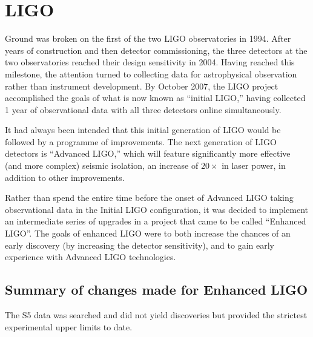 \section{LIGO}

Ground was broken on the first of the two LIGO observatories in 1994.
After years of construction and then detector commissioning, the three
detectors at the two observatories reached their design sensitivity in
2004.  Having reached this milestone, the attention turned to
collecting data for astrophysical observation rather than instrument
development.  By October 2007, the LIGO project accomplished the goals
of what is now known as ``initial LIGO,'' having collected 1 year of
observational data with all three detectors online simultaneously.

It had always been intended that this initial generation of LIGO would
be followed by a programme of improvements.  The next generation of
LIGO detectors is ``Advanced LIGO,'' which will feature significantly
more effective (and more complex) seismic isolation, an increase of
$20\times$ in laser power, in addition to other improvements.

Rather than spend the entire time before the onset of Advanced LIGO
taking observational data in the Initial LIGO configuration, it was
decided to implement an intermediate series of upgrades in a project
that came to be called ``Enhanced
LIGO''\cite{Adhikari2006Enhanced,T050252,JoshSmithEnhancedAdvanced}.
The goals of enhanced LIGO were to both increase the chances of an
early discovery (by increasing the detector sensitivity), and to gain
early experience with Advanced LIGO technologies.

\subsection{Summary of changes made for Enhanced LIGO}


The S5 data was searched and did not yield discoveries but provided
the strictest experimental upper limits to date. ~\cite{S5CBCnospin,
  S5CBC5months, S5burst, S5knownpulsars, S5GRB070201,
  S5NatureStochastic}

